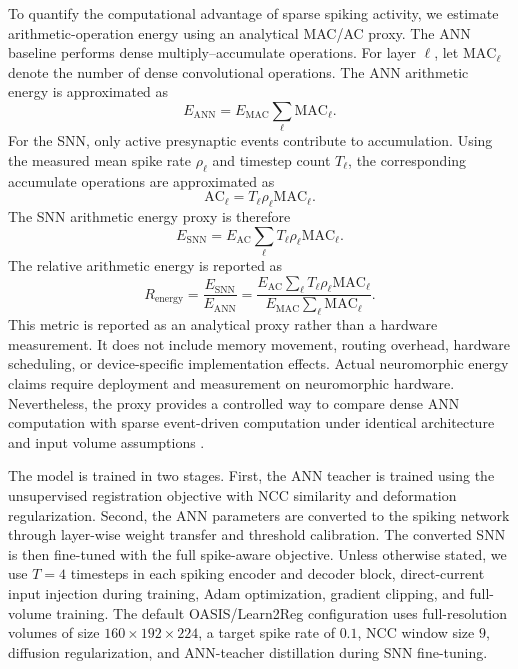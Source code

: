 To quantify the computational advantage of sparse spiking activity, we estimate arithmetic-operation energy using an analytical MAC/AC proxy. The ANN baseline performs dense multiply--accumulate operations. For layer $\ell$, let $\mathrm{MAC}_{\ell}$ denote the number of dense convolutional operations. The ANN arithmetic energy is approximated as
\begin{equation}
    E_{\mathrm{ANN}}
    =
    E_{\mathrm{MAC}}
    \sum_{\ell}
    \mathrm{MAC}_{\ell}.
\end{equation}
For the SNN, only active presynaptic events contribute to accumulation. Using the measured mean spike rate $\rho_{\ell}$ and timestep count $T_{\ell}$, the corresponding accumulate operations are approximated as
\begin{equation}
    \mathrm{AC}_{\ell}
    =
    T_{\ell}\rho_{\ell}\mathrm{MAC}_{\ell}.
\end{equation}
The SNN arithmetic energy proxy is therefore
\begin{equation}
    E_{\mathrm{SNN}}
    =
    E_{\mathrm{AC}}
    \sum_{\ell}
    T_{\ell}\rho_{\ell}\mathrm{MAC}_{\ell}.
\end{equation}
The relative arithmetic energy is reported as
\begin{equation}
    R_{\mathrm{energy}}
    =
    \frac{E_{\mathrm{SNN}}}{E_{\mathrm{ANN}}}
    =
    \frac{
    E_{\mathrm{AC}}
    \sum_{\ell} T_{\ell}\rho_{\ell}\mathrm{MAC}_{\ell}
    }{
    E_{\mathrm{MAC}}
    \sum_{\ell}\mathrm{MAC}_{\ell}
    }.
\end{equation}
This metric is reported as an analytical proxy rather than a hardware measurement. It does not include memory movement, routing overhead, hardware scheduling, or device-specific implementation effects. Actual neuromorphic energy claims require deployment and measurement on neuromorphic hardware. Nevertheless, the proxy provides a controlled way to compare dense ANN computation with sparse event-driven computation under identical architecture and input volume assumptions \citep{horowitz2014computing,indiveri2015memory,rueckauer2017conversion}.


The model is trained in two stages. First, the ANN teacher is trained using the unsupervised registration objective with NCC similarity and deformation regularization. Second, the ANN parameters are converted to the spiking network through layer-wise weight transfer and threshold calibration. The converted SNN is then fine-tuned with the full spike-aware objective. Unless otherwise stated, we use $T=4$ timesteps in each spiking encoder and decoder block, direct-current input injection during training, Adam optimization, gradient clipping, and full-volume training. The default OASIS/Learn2Reg configuration uses full-resolution volumes of size $160 \times 192 \times 224$, a target spike rate of $0.1$, NCC window size $9$, diffusion regularization, and ANN-teacher distillation during SNN fine-tuning.

